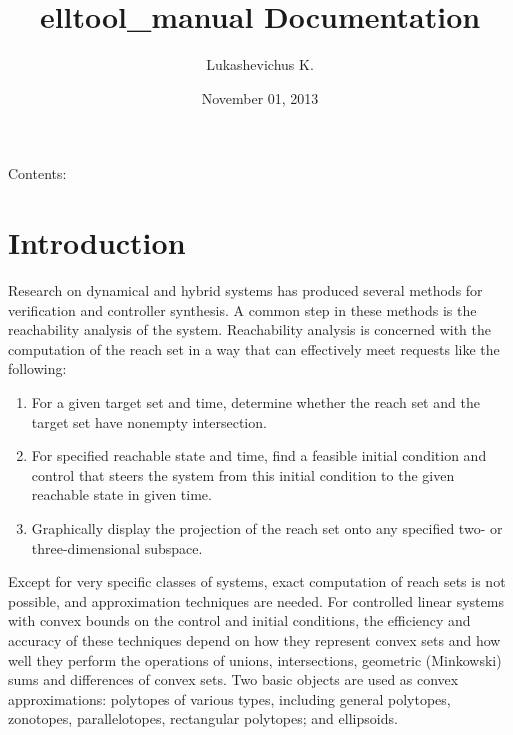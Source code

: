 \documentclass[letterpaper,10pt,english]{sphinxmanual}
\title{elltool\_manual Documentation}
\date{November 01, 2013}
\author{Lukashevichus K.}
\begin{document}
\maketitle
\tableofcontents
{}\label{main_manual::doc}


Contents:


\chapter{Introduction}
\label{chap_intro:introduction}\label{chap_intro::doc}\label{chap_intro:welcome-to-ellipsoidal-toolbox-documentation}
Research on dynamical and hybrid systems has produced several methods
for verification and controller synthesis. A common step in these
methods is the reachability analysis of the system. Reachability
analysis is concerned with the computation of the reach set in a way
that can effectively meet requests like the following:
\begin{enumerate}
\item {} 
For a given target set and time, determine whether the reach set and
the target set have nonempty intersection.

\item {} 
For specified reachable state and time, find a feasible initial
condition and control that steers the system from this initial
condition to the given reachable state in given time.

\item {} 
Graphically display the projection of the reach set onto any
specified two- or three-dimensional subspace.

\end{enumerate}

Except for very specific classes of systems, exact computation of reach
sets is not possible, and approximation techniques are needed. For
controlled linear systems with convex bounds on the control and initial
conditions, the efficiency and accuracy of these techniques depend on
how they represent convex sets and how well they perform the operations
of unions, intersections, geometric (Minkowski) sums and differences of
convex sets. Two basic objects are used as convex approximations:
polytopes of various types, including general polytopes, zonotopes,
parallelotopes, rectangular polytopes; and ellipsoids.
\end{document}
